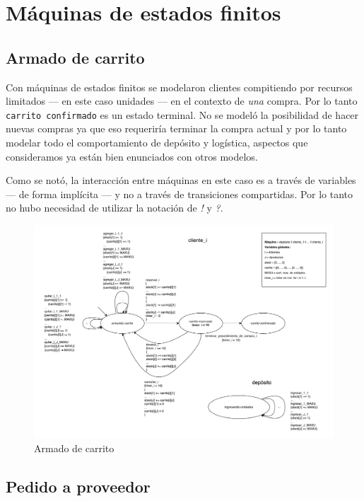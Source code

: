 \section{Máquinas de estados finitos}

\subsection{Armado de carrito}
Con máquinas de estados finitos se modelaron clientes compitiendo por recursos
limitados --- en este caso unidades --- en el contexto de \textit{una} compra.
Por lo tanto \texttt{carrito confirmado} es un estado terminal.
No se modeló la posibilidad de hacer nuevas compras ya que eso requeriría
terminar la compra actual y por lo tanto modelar todo el comportamiento de
depósito y logística, aspectos que consideramos ya están bien enunciados con
otros modelos.

Como se notó, la interacción entre máquinas en este caso es a través de
variables --- de forma implícita --- y no a través de transiciones compartidas.
Por lo tanto no hubo necesidad de utilizar la notación de \textit{!} y
\textit{?}.

\newpage

\begin{figure}[H]
  \begin{center}
  \includegraphics[angle=90,height=.9\textheight]{tp2/images/fsm.pdf}
  \end{center}
  \caption{Armado de carrito}
  \label{fsm:compra}
\end{figure}

\subsection{Pedido a proveedor}


